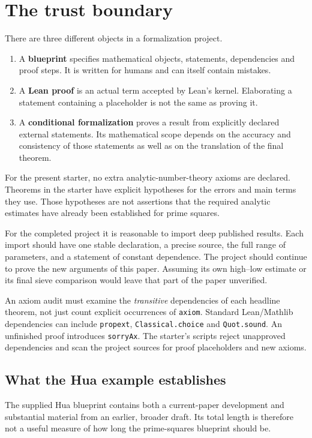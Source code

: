 \documentclass[11pt]{article}
\newcommand{\lean}[1]{\nolinkurl{#1}}
\newcommand{\page}{\newpage}
\begin{document}
\page
\section{The trust boundary}
There are three different objects in a formalization project.
\begin{enumerate}
\item A \textbf{blueprint} specifies mathematical objects, statements, dependencies and
proof steps. It is written for humans and can itself contain mistakes.
\item A \textbf{Lean proof} is an actual term accepted by Lean's kernel. Elaborating
a statement containing a placeholder is not the same as proving it.
\item A \textbf{conditional formalization} proves a result from explicitly declared
external statements. Its mathematical scope depends on the accuracy and consistency
of those statements as well as on the translation of the final theorem.
\end{enumerate}

For the present starter, no extra analytic-number-theory axioms are declared.
Theorems in the starter have explicit hypotheses for the errors and main terms they
use. Those hypotheses are not assertions that the required analytic estimates have
already been established for prime squares.

For the completed project it is reasonable to import deep published results.
Each import should have one stable declaration, a precise source, the full range of
parameters, and a statement of constant dependence. The project should continue
to prove the new arguments of this paper. Assuming its own high--low estimate or
its final sieve comparison would leave that part of the paper unverified.

An axiom audit must examine the \emph{transitive} dependencies of each headline
theorem, not just count explicit occurrences of \lean{axiom}. Standard Lean/Mathlib
dependencies can include \lean{propext}, \lean{Classical.choice} and
\lean{Quot.sound}. An unfinished proof introduces \lean{sorryAx}. The starter's
scripts reject unapproved dependencies and scan the project sources for proof
placeholders and new axioms.

\subsection*{What the Hua example establishes}
The supplied Hua blueprint contains both a current-paper development and substantial
material from an earlier, broader draft. Its total length is therefore not a useful
measure of how long the prime-squares blueprint should be.
\end{document}
